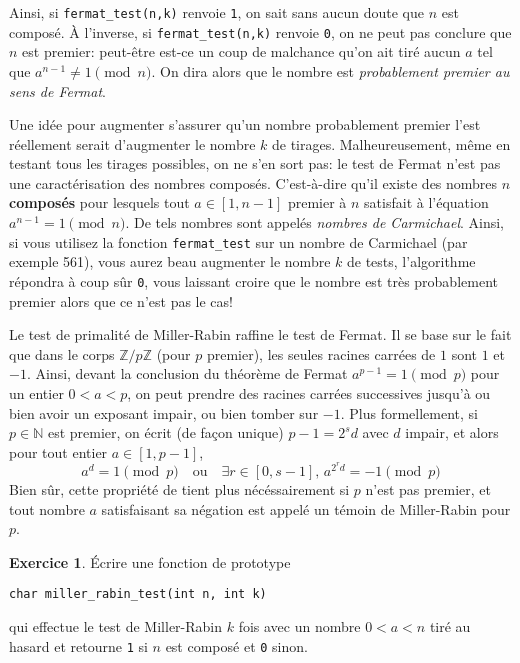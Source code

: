 \documentclass[french,a4paper]{article}
\theoremstyle{definition}
\newtheorem{exercise}{Exercice}
\theoremstyle{remark}
\newcommand{\inlinec}[1]{\lstinline[style=C]°#1°}
\begin{document}
Ainsi, si \inlinec{fermat_test(n,k)} renvoie \inlinec{1}, on sait sans
aucun doute que $n$ est composé. \`A l'inverse, si
\inlinec{fermat_test(n,k)} renvoie \inlinec{0}, on ne peut pas
conclure que $n$ est premier: peut-être est-ce un coup de malchance
qu'on ait tiré aucun $a$ tel que $a^{n-1} \neq 1 \pmod n$. On dira
alors que le nombre est {\em probablement premier au sens de Fermat}.

Une idée pour augmenter s'assurer qu'un nombre probablement premier
l'est réellement serait d'augmenter le nombre $k$ de
tirages. Malheureusement, même en testant tous les tirages possibles,
on ne s'en sort pas: le test de Fermat n'est pas une caractérisation
des nombres composés. C'est-à-dire qu'il existe des nombres $n$ {\bf
  composés} pour lesquels tout $a\in [1,n-1]$ premier à $n$ satisfait
à l'équation $a^{n-1} = 1 \pmod n$. De tels nombres sont appelés {\em
  nombres de Carmichael}. Ainsi, si vous utilisez la fonction
\inlinec{fermat_test} sur un nombre de Carmichael (par exemple 561),
vous aurez beau augmenter le nombre $k$ de tests, l'algorithme
répondra à coup sûr \inlinec{0}, vous laissant croire que le nombre
est très probablement premier alors que ce n'est pas le cas!

\medskip

Le test de primalité de Miller-Rabin raffine le test de Fermat. Il se
base sur le fait que dans le corps $\mathbb Z/p\mathbb Z$ (pour $p$
premier), les seules racines carrées de $1$ sont $1$ et $-1$. Ainsi,
devant la conclusion du théorème de Fermat $a^{p-1} = 1 \pmod p$ pour
un entier $0<a<p$, on peut prendre des racines carrées successives
jusqu'à ou bien avoir un exposant impair, ou bien tomber sur
$-1$. Plus formellement, si $p \in \mathbb N$ est premier, on écrit
(de façon unique) $p-1 = 2^sd$ avec $d$ impair, et alors pour tout
entier $a \in [1,p-1]$,
\begin{displaymath}
  a^d = 1 \pmod p
  \quad\text{ou}\quad
  \exists r \in [0,s-1],\, a^{2^rd} = -1 \pmod p
\end{displaymath}
Bien sûr, cette propriété de tient plus nécéssairement si $p$ n'est
pas premier, et tout nombre $a$ satisfaisant sa négation est appelé un
témoin de Miller-Rabin pour $p$.

\begin{exercise}
  \'Ecrire une fonction de prototype
  \begin{lstlisting}
char miller_rabin_test(int n, int k)
  \end{lstlisting}
  qui effectue le test de Miller-Rabin $k$ fois avec un nombre $0<a<n$
  tiré au hasard et retourne \inlinec{1} si $n$ est composé et
  \inlinec{0} sinon.
\end{exercise}
\end{document}
